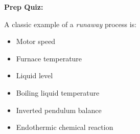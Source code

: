 \vfil \eject

\noindent
{\bf Prep Quiz:}

A classic example of a {\it runaway} process is:

\begin{itemize}
\item{} Motor speed 
\vskip 5pt 
\item{} Furnace temperature
\vskip 5pt 
\item{} Liquid level
\vskip 5pt 
\item{} Boiling liquid temperature
\vskip 5pt 
\item{} Inverted pendulum balance
\vskip 5pt 
\item{} Endothermic chemical reaction
\end{itemize}





